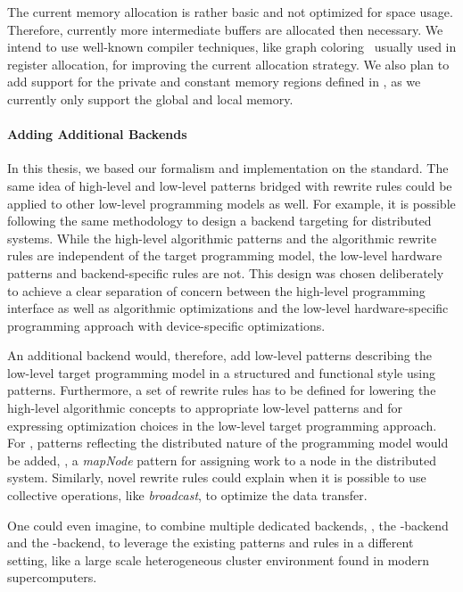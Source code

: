 The current memory allocation is rather basic and not optimized for space usage.
Therefore, currently more intermediate buffers are allocated then necessary.
We intend to use well-known compiler techniques, like graph coloring~\cite{Muchnick1997} usually used in register allocation, for improving the current allocation strategy.
We also plan to add support for the private and constant memory regions defined in \OpenCL, as we currently only support the global and local memory.

\paragraph{Adding Additional Backends}
In this thesis, we based our formalism and implementation on the \OpenCL standard.
The same idea of high-level and low-level patterns bridged with rewrite rules could be applied to other low-level programming models as well.
For example, it is possible following the same methodology to design a backend targeting \MPI for distributed systems.
While the high-level algorithmic patterns and the algorithmic rewrite rules are independent of the target programming model, the low-level hardware patterns and  backend-specific rules are not.
This design was chosen deliberately to achieve a clear separation of concern between the high-level programming interface as well as algorithmic optimizations and the low-level hardware-specific programming approach with device-specific optimizations.

An additional backend would, therefore, add low-level patterns describing the low-level target programming model in a structured and functional style using patterns.
Furthermore, a set of rewrite rules has to be defined for lowering the high-level algorithmic concepts to appropriate low-level patterns and for expressing optimization choices in the low-level target programming approach.
For \MPI, patterns reflecting the distributed nature of the programming model would be added, \eg, a \emph{mapNode} pattern for assigning work to a node in the distributed system.
Similarly, novel rewrite rules could explain when it is possible to use collective operations, like \emph{broadcast}, to optimize the data transfer.

One could even imagine, to combine multiple dedicated backends, \eg, the \MPI-backend and the \OpenCL-backend, to leverage the existing patterns and rules in a different setting, like a large scale heterogeneous cluster environment found in modern supercomputers.

